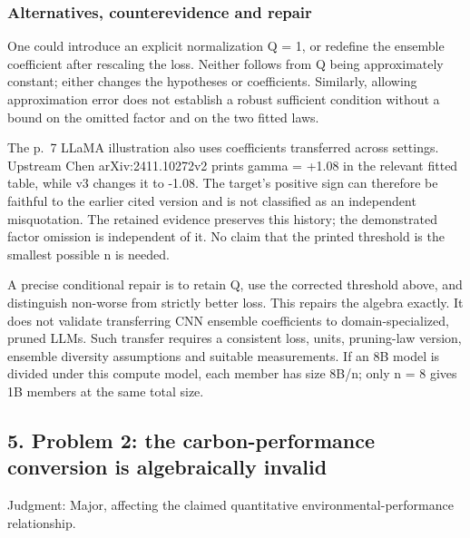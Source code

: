 \documentclass[10pt]{article}
\begin{document}
\subsubsection*{Alternatives, counterevidence and repair}
One could introduce an explicit normalization Q = 1, or redefine the ensemble coefficient after rescaling the loss. Neither follows from Q being approximately constant; either changes the hypotheses or coefficients. Similarly, allowing approximation error does not establish a robust sufficient condition without a bound on the omitted factor and on the two fitted laws.\par
The p. 7 LLaMA illustration also uses coefficients transferred across settings. Upstream Chen arXiv:2411.10272v2 prints gamma = +1.08 in the relevant fitted table, while v3 changes it to -1.08. The target’s positive sign can therefore be faithful to the earlier cited version and is not classified as an independent misquotation. The retained evidence preserves this history; the demonstrated factor omission is independent of it. No claim that the printed threshold is the smallest possible n is needed.\par
A precise conditional repair is to retain Q, use the corrected threshold above, and distinguish non-worse from strictly better loss. This repairs the algebra exactly. It does not validate transferring CNN ensemble coefficients to domain-specialized, pruned LLMs. Such transfer requires a consistent loss, units, pruning-law version, ensemble diversity assumptions and suitable measurements. If an 8B model is divided under this compute model, each member has size 8B/n; only n = 8 gives 1B members at the same total size.\par
\subsection*{5. Problem 2: the carbon-performance conversion is algebraically invalid}
Judgment: Major, affecting the claimed quantitative environmental-performance relationship.\par
\end{document}
